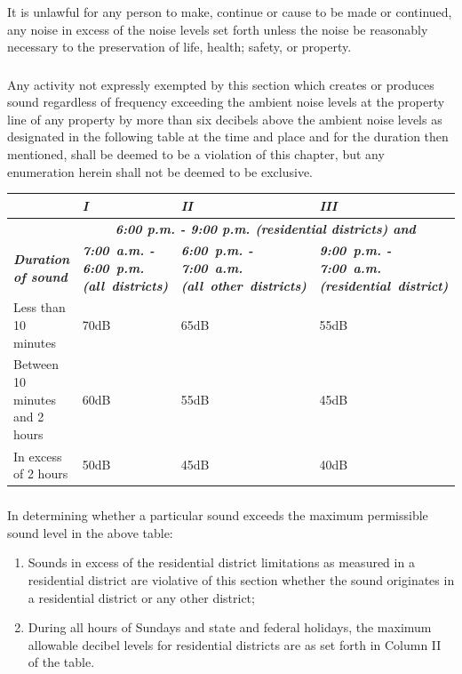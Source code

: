 \subsubsection{}
It is unlawful for any person to make, continue or cause to be made or continued, any noise in excess of the noise levels set forth unless the noise be reasonably necessary to the preservation of life, health; safety, or property.
\subsubsection{}
Any activity not expressly exempted by this section which creates or produces sound regardless of frequency exceeding the ambient noise levels at the property line of any property by more than six decibels above the ambient noise levels as designated in the following table at the time and place and for the duration then mentioned, shall be deemed to be a violation of this chapter, but any enumeration herein shall not be deemed to be exclusive.\\
\begin{center}
\begin{tabular}{|p{3.5cm}|p{3.5cm}|p{3.5cm}|p{3.5cm}|}
    \hline
    \multirow{2}{*}{~} & \emph{\textbf{I}} & \emph{\textbf{II}} & \emph{\textbf{III}}\\
    \hline
    & \multicolumn{3}{|c|}{\emph{\textbf{6:00 p.m. - 9:00 p.m. (residential districts) and}}}\\
    \hline
    \emph{\textbf{Duration of sound}} & \emph{\textbf{\mbox{7:00 a.m.} - \mbox{6:00 p.m.} \mbox{(all districts)}}} & \emph{\textbf{\mbox{6:00 p.m.} - \mbox{7:00 a.m.} \mbox{(all other districts)}}} & \emph{\textbf{\mbox{9:00 p.m.} - \mbox{7:00 a.m.} \mbox{(residential district)}}}\\
    \hline
    Less than 10 minutes & 70dB & 65dB & 55dB\\
    \hline
    Between 10 minutes and 2 hours & 60dB & 55dB & 45dB\\
    \hline
    In excess of 2 hours & 50dB & 45dB & 40dB\\
    \hline
\end{tabular}
\end{center}
\subsubsection{}
In determining whether a particular sound exceeds the maximum permissible sound level in the above table: 
\begin{enumerate}[{\indent}a)]
    \item Sounds in excess of the residential district limitations as measured in a residential district are violative of this section whether the sound originates in a residential district or any other district; 
    \item During all hours of Sundays and state and federal holidays, the maximum allowable decibel levels for residential districts are as set forth in Column II of the table.
\end{enumerate}
